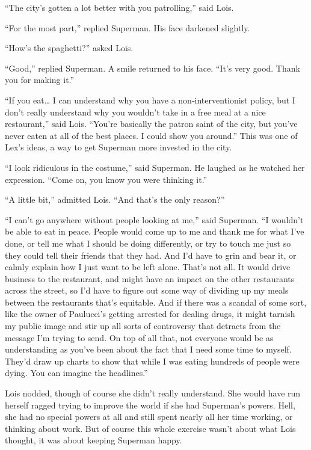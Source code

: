 ``The city's gotten a lot better with you patrolling,'' said Lois.

``For the most part,'' replied Superman. His face darkened slightly.

``How's the spaghetti?'' asked Lois.

``Good,'' replied Superman. A smile returned to his face. ``It's very
good. Thank you for making it.''

``If you eat\ldots{} I can understand why you have a non‐interventionist
policy, but I don't really understand why you wouldn't take in a free
meal at a nice restaurant,'' said Lois. ``You're basically the patron
saint of the city, but you've never eaten at all of the best places. I
could show you around.'' This was one of Lex's ideas, a way to get
Superman more invested in the city.

``I look ridiculous in the costume,'' said Superman. He laughed as he
watched her expression. ``Come on, you know you were thinking it.''

``A little bit,'' admitted Lois. ``And that's the only reason?''

``I can't go anywhere without people looking at me,'' said Superman. ``I
wouldn't be able to eat in peace. People would come up to me and thank
me for what I've done, or tell me what I should be doing differently, or
try to touch me just so they could tell their friends that they had. And
I'd have to grin and bear it, or calmly explain how I just want to be
left alone. That's not all. It would drive business to the restaurant,
and might have an impact on the other restaurants across the street, so
I'd have to figure out some way of dividing up my meals between the
restaurants that's equitable. And if there was a scandal of some sort,
like the owner of Paulucci's getting arrested for dealing drugs, it
might tarnish my public image and stir up all sorts of controversy that
detracts from the message I'm trying to send. On top of all that, not
everyone would be as understanding as you've been about the fact that I
need some time to myself. They'd draw up charts to show that while I was
eating hundreds of people were dying. You can imagine the headlines.''

Lois nodded, though of course she didn't really understand. She would
have run herself ragged trying to improve the world if she had
Superman's powers. Hell, she had no special powers at all and still
spent nearly all her time working, or thinking about work. But of course
this whole exercise wasn't about what Lois thought, it was about keeping
Superman happy.

